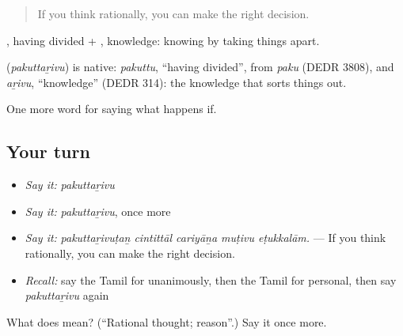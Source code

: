 \begin{quote}
If you think rationally, you can make the right decision.
\end{quote}

, having divided + , knowledge: knowing by taking things apart.

\begin{cousinweb}
\textbf{} (\emph{pakuttaṟivu}) is native: \emph{pakuttu}, \textquotedblleft{}having divided\textquotedblright{}, from \emph{paku} (DEDR 3808), and \emph{aṟivu}, \textquotedblleft{}knowledge\textquotedblright{} (DEDR 314): the knowledge that sorts things out.
\end{cousinweb}

\begin{grammarlens}[title={What you've built}]
One more word for saying what happens if.
\end{grammarlens}

\subsection*{Your turn}
\begin{itemize}
\raggedright
  \item \emph{Say it:} \emph{pakuttaṟivu}
  \item \emph{Say it:} \emph{pakuttaṟivu}, once more
  \item \emph{Say it:} \emph{pakuttaṟivuṭaṉ cintittāl cariyāṉa muṭivu eṭukkalām.} — If you think rationally, you can make the right decision.
  \item \emph{Recall:} say the Tamil for unanimously, then the Tamil for personal, then say \emph{pakuttaṟivu} again
\end{itemize}

\begin{tcolorbox}[breakable,colback=teal!4,colframe=teal!35!black,title={Before you move on}]
What does  mean? (\textquotedblleft{}Rational thought; reason\textquotedblright{}.) Say it once more.
\end{tcolorbox}

